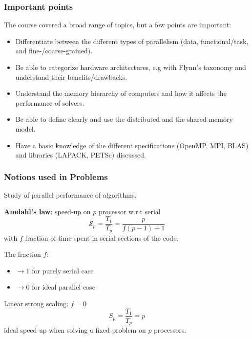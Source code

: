 \begin{frame}
  \frametitle{Important points}

The course covered a broad range of topics, but a few points are important:
\begin{itemize}
\item Differentiate between the different types of parallelism (data, functional/task, and fine-/coarse-grained).
\item Be able to categorize hardware architectures, e.g with Flynn's taxonomy and understand their benefits/drawbacks.
\item Understand the memory hierarchy of computers and how it affects the performance of solvers.
\item Be able to define clearly and use the distributed and the shared-memory model.
\item Have a basic knowledge of the different specifications (OpenMP, MPI, BLAS) and libraries (LAPACK, PETSc) discussed. 
\end{itemize}

\end{frame}


\begin{frame}
  \frametitle{Notions used in Problems}

Study of parallel performance of algorithms.

\medskip
\textbf{Amdahl's law}: speed-up on $p$ processor w.r.t serial
\begin{equation*}
\mathcal{S}_p = \dfrac{T_1}{T_p} = \dfrac{p}{f (p - 1) + 1}
\end{equation*}
with $f$ fraction of time spent in serial sections of the code.

\medskip
The fraction $f$:
\begin{itemize}
\item $\rightarrow 1$ for purely serial case\\[2ex]
\item $\rightarrow 0$ for ideal parallel case
\end{itemize}

Linear strong scaling: $f = 0$
\begin{equation*}
S_p = \dfrac{T_1}{T_p} = p
\end{equation*}
ideal speed-up when solving a fixed problem on $p$ processors.

\end{frame}

